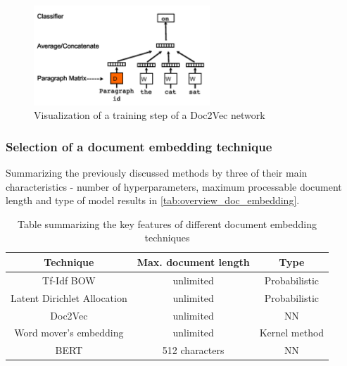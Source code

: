\begin{figure}[t]
	\centering
	\includegraphics[width=250px]{../chapters/implementation/pics/doc2vec}
	\caption{\label{pic:doc2vec} Visualization of a training step of a Doc2Vec network {\cite{wuWordMoverEmbedding2018}}}
\end{figure}

\subsubsection{Selection of a document embedding technique}

Summarizing the previously discussed methods by three of their main characteristics - number of hyperparameters, maximum processable document length and type of model results in  \autoref{tab:overview_doc_embedding}.
\begin{table}
	\centering
	\begin{tabular}{ c | c | c }
		\hline 
		Technique & Max. document length & Type \\ \hline
		Tf-Idf BOW & unlimited & Probabilistic \\ \hline
		Latent Dirichlet Allocation & unlimited & Probabilistic \\ \hline
		Doc2Vec & unlimited & NN \\ \hline
		Word mover's embedding & unlimited & Kernel method \\ \hline
		BERT & 512 characters & NN \\ \hline
	\end{tabular}
	\caption{\label{tab:overview_doc_embedding} Table summarizing the key features of different document embedding techniques}
\end{table}

